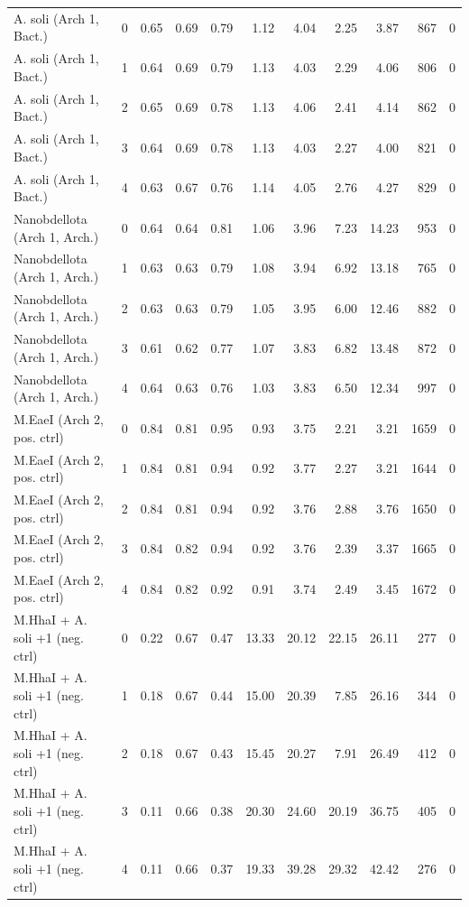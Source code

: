 \documentclass[10pt,letterpaper]{article}
\begin{document}
{\begin{longtable}{@{}lrrrrrrrrrr@{}}
A. soli (Arch 1, Bact.) & 0 & 0.65 & 0.69 & 0.79 & 1.12 & 4.04 & 2.25 & 3.87 & 867 & 0 \\
A. soli (Arch 1, Bact.) & 1 & 0.64 & 0.69 & 0.79 & 1.13 & 4.03 & 2.29 & 4.06 & 806 & 0 \\
A. soli (Arch 1, Bact.) & 2 & 0.65 & 0.69 & 0.78 & 1.13 & 4.06 & 2.41 & 4.14 & 862 & 0 \\
A. soli (Arch 1, Bact.) & 3 & 0.64 & 0.69 & 0.78 & 1.13 & 4.03 & 2.27 & 4.00 & 821 & 0 \\
A. soli (Arch 1, Bact.) & 4 & 0.63 & 0.67 & 0.76 & 1.14 & 4.05 & 2.76 & 4.27 & 829 & 0 \\
Nanobdellota (Arch 1, Arch.) & 0 & 0.64 & 0.64 & 0.81 & 1.06 & 3.96 & 7.23 & 14.23 & 953 & 0 \\
Nanobdellota (Arch 1, Arch.) & 1 & 0.63 & 0.63 & 0.79 & 1.08 & 3.94 & 6.92 & 13.18 & 765 & 0 \\
Nanobdellota (Arch 1, Arch.) & 2 & 0.63 & 0.63 & 0.79 & 1.05 & 3.95 & 6.00 & 12.46 & 882 & 0 \\
Nanobdellota (Arch 1, Arch.) & 3 & 0.61 & 0.62 & 0.77 & 1.07 & 3.83 & 6.82 & 13.48 & 872 & 0 \\
Nanobdellota (Arch 1, Arch.) & 4 & 0.64 & 0.63 & 0.76 & 1.03 & 3.83 & 6.50 & 12.34 & 997 & 0 \\
M.EaeI (Arch 2, pos. ctrl) & 0 & 0.84 & 0.81 & 0.95 & 0.93 & 3.75 & 2.21 & 3.21 & 1659 & 0 \\
M.EaeI (Arch 2, pos. ctrl) & 1 & 0.84 & 0.81 & 0.94 & 0.92 & 3.77 & 2.27 & 3.21 & 1644 & 0 \\
M.EaeI (Arch 2, pos. ctrl) & 2 & 0.84 & 0.81 & 0.94 & 0.92 & 3.76 & 2.88 & 3.76 & 1650 & 0 \\
M.EaeI (Arch 2, pos. ctrl) & 3 & 0.84 & 0.82 & 0.94 & 0.92 & 3.76 & 2.39 & 3.37 & 1665 & 0 \\
M.EaeI (Arch 2, pos. ctrl) & 4 & 0.84 & 0.82 & 0.92 & 0.91 & 3.74 & 2.49 & 3.45 & 1672 & 0 \\
M.HhaI + A. soli +1 (neg. ctrl) & 0 & 0.22 & 0.67 & 0.47 & 13.33 & 20.12 & 22.15 & 26.11 & 277 & 0 \\
M.HhaI + A. soli +1 (neg. ctrl) & 1 & 0.18 & 0.67 & 0.44 & 15.00 & 20.39 & 7.85 & 26.16 & 344 & 0 \\
M.HhaI + A. soli +1 (neg. ctrl) & 2 & 0.18 & 0.67 & 0.43 & 15.45 & 20.27 & 7.91 & 26.49 & 412 & 0 \\
M.HhaI + A. soli +1 (neg. ctrl) & 3 & 0.11 & 0.66 & 0.38 & 20.30 & 24.60 & 20.19 & 36.75 & 405 & 0 \\
M.HhaI + A. soli +1 (neg. ctrl) & 4 & 0.11 & 0.66 & 0.37 & 19.33 & 39.28 & 29.32 & 42.42 & 276 & 0 \\
\end{longtable}
}
\end{document}

